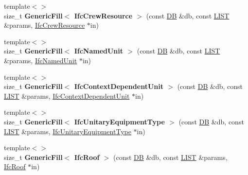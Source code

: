 \begin{DoxyCompactItemize}
\item 
\hypertarget{namespace_assimp_1_1_s_t_e_p_a07624fae47a8bb30f86079c9467aa45d}{{\footnotesize template$<$$>$ }\\size\+\_\+t {\bfseries Generic\+Fill$<$ Ifc\+Crew\+Resource $>$} (const \hyperlink{class_assimp_1_1_s_t_e_p_1_1_d_b}{D\+B} \&db, const \hyperlink{class_assimp_1_1_s_t_e_p_1_1_e_x_p_r_e_s_s_1_1_l_i_s_t}{L\+I\+S\+T} \&params, \hyperlink{struct_assimp_1_1_i_f_c_1_1_ifc_crew_resource}{Ifc\+Crew\+Resource} $\ast$in)}\label{namespace_assimp_1_1_s_t_e_p_a07624fae47a8bb30f86079c9467aa45d}

\item 
\hypertarget{namespace_assimp_1_1_s_t_e_p_afb0b990f11163b6b0f9d582312f04cca}{{\footnotesize template$<$$>$ }\\size\+\_\+t {\bfseries Generic\+Fill$<$ Ifc\+Named\+Unit $>$} (const \hyperlink{class_assimp_1_1_s_t_e_p_1_1_d_b}{D\+B} \&db, const \hyperlink{class_assimp_1_1_s_t_e_p_1_1_e_x_p_r_e_s_s_1_1_l_i_s_t}{L\+I\+S\+T} \&params, \hyperlink{struct_assimp_1_1_i_f_c_1_1_ifc_named_unit}{Ifc\+Named\+Unit} $\ast$in)}\label{namespace_assimp_1_1_s_t_e_p_afb0b990f11163b6b0f9d582312f04cca}

\item 
\hypertarget{namespace_assimp_1_1_s_t_e_p_a25d4717d9f25cb9cbcc2493401822789}{{\footnotesize template$<$$>$ }\\size\+\_\+t {\bfseries Generic\+Fill$<$ Ifc\+Context\+Dependent\+Unit $>$} (const \hyperlink{class_assimp_1_1_s_t_e_p_1_1_d_b}{D\+B} \&db, const \hyperlink{class_assimp_1_1_s_t_e_p_1_1_e_x_p_r_e_s_s_1_1_l_i_s_t}{L\+I\+S\+T} \&params, \hyperlink{struct_assimp_1_1_i_f_c_1_1_ifc_context_dependent_unit}{Ifc\+Context\+Dependent\+Unit} $\ast$in)}\label{namespace_assimp_1_1_s_t_e_p_a25d4717d9f25cb9cbcc2493401822789}

\item 
\hypertarget{namespace_assimp_1_1_s_t_e_p_a35ff34e7667ccb15a52f40415a5255a1}{{\footnotesize template$<$$>$ }\\size\+\_\+t {\bfseries Generic\+Fill$<$ Ifc\+Unitary\+Equipment\+Type $>$} (const \hyperlink{class_assimp_1_1_s_t_e_p_1_1_d_b}{D\+B} \&db, const \hyperlink{class_assimp_1_1_s_t_e_p_1_1_e_x_p_r_e_s_s_1_1_l_i_s_t}{L\+I\+S\+T} \&params, \hyperlink{struct_assimp_1_1_i_f_c_1_1_ifc_unitary_equipment_type}{Ifc\+Unitary\+Equipment\+Type} $\ast$in)}\label{namespace_assimp_1_1_s_t_e_p_a35ff34e7667ccb15a52f40415a5255a1}

\item 
\hypertarget{namespace_assimp_1_1_s_t_e_p_a9b35cc6908888ed617e455e9a4dc9f44}{{\footnotesize template$<$$>$ }\\size\+\_\+t {\bfseries Generic\+Fill$<$ Ifc\+Roof $>$} (const \hyperlink{class_assimp_1_1_s_t_e_p_1_1_d_b}{D\+B} \&db, const \hyperlink{class_assimp_1_1_s_t_e_p_1_1_e_x_p_r_e_s_s_1_1_l_i_s_t}{L\+I\+S\+T} \&params, \hyperlink{struct_assimp_1_1_i_f_c_1_1_ifc_roof}{Ifc\+Roof} $\ast$in)}\label{namespace_assimp_1_1_s_t_e_p_a9b35cc6908888ed617e455e9a4dc9f44}


\end{DoxyCompactItemize}
